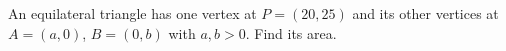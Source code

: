 An equilateral triangle has one vertex at $P=(20,25)$ and its other vertices at $A=(a,0)$, $B=(0,b)$ with $a,b>0$. Find its area.
